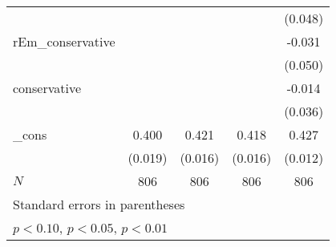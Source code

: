 {\begin{tabular}{l*{4}{c}}
            &                     &                     &                     &     (0.048)         \\
\addlinespace
rEm\_conservative&                     &                     &                     &      -0.031         \\
            &                     &                     &                     &     (0.050)         \\
\addlinespace
conservative&                     &                     &                     &      -0.014         \\
            &                     &                     &                     &     (0.036)         \\
\addlinespace
\_cons      &       0.400\sym{***}&       0.421\sym{***}&       0.418\sym{***}&       0.427\sym{***}\\
            &     (0.019)         &     (0.016)         &     (0.016)         &     (0.012)         \\
\midrule
\(N\)       &         806         &         806         &         806         &         806         \\
\bottomrule
\multicolumn{5}{l}{\footnotesize Standard errors in parentheses}\\
\multicolumn{5}{l}{\footnotesize \sym{*} \(p<0.10\), \sym{**} \(p<0.05\), \sym{***} \(p<0.01\)}\\
\end{tabular}
}
